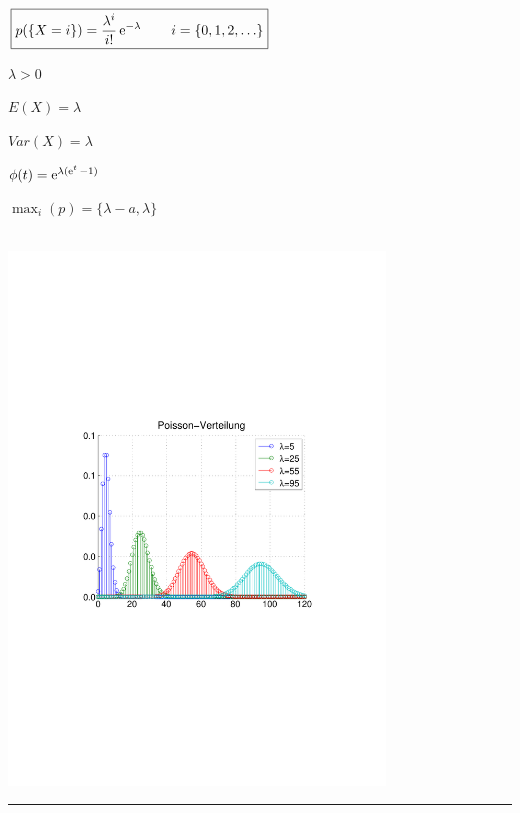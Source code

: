 \begin{minipage}{10cm}
	\begin{liste}
		\item $\boxed{p(\{X=i\}) = \frac{\lambda^i}{i!}\operatorname{\mathrm e}^{-\lambda}\qquad i=\{0,1,2,\ldots\}}$
		\vspace{0.2cm}
		\item $\lambda > 0$
	\end{liste}
\end{minipage}
\hfill
\begin{minipage}{8cm}
	\begin{liste}
		\item $E(X)=\lambda$
		\item $Var(X)=\lambda$
		\item $\phi(t)=\operatorname{\mathrm e}^{\lambda(\operatorname{\mathrm e}^t-1)}$
		\item $\max_i(p) = \{\lambda-a, \lambda\}$
	\end{liste}
\end{minipage}\\

\includegraphics[width=10cm,trim=4.0cm 9.5cm 4.0cm 9.25cm ,clip]{Content/RandomVariable/Poisson}

\vspace{2mm}
\hrule
\vspace{3mm}

